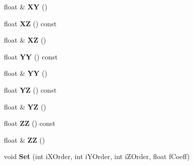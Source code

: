 \begin{DoxyCompactItemize}
\item 
float \& {\bfseries XY} ()\hypertarget{class_i_dream_sky_1_1_quadratic3_ace59a08e7f7f9939187899d1bd9c19e2}{}\label{class_i_dream_sky_1_1_quadratic3_ace59a08e7f7f9939187899d1bd9c19e2}

\item 
float {\bfseries XZ} () const \hypertarget{class_i_dream_sky_1_1_quadratic3_a90ebbdca6e12599e12ecb9d8e4b46a60}{}\label{class_i_dream_sky_1_1_quadratic3_a90ebbdca6e12599e12ecb9d8e4b46a60}

\item 
float \& {\bfseries XZ} ()\hypertarget{class_i_dream_sky_1_1_quadratic3_a054207ff4d3bb23920f407c149e623a5}{}\label{class_i_dream_sky_1_1_quadratic3_a054207ff4d3bb23920f407c149e623a5}

\item 
float {\bfseries YY} () const \hypertarget{class_i_dream_sky_1_1_quadratic3_a0362d59a4bec2b548476c17549f7b4b1}{}\label{class_i_dream_sky_1_1_quadratic3_a0362d59a4bec2b548476c17549f7b4b1}

\item 
float \& {\bfseries YY} ()\hypertarget{class_i_dream_sky_1_1_quadratic3_af0f3426bf9f33e0ef3225d27656fc51d}{}\label{class_i_dream_sky_1_1_quadratic3_af0f3426bf9f33e0ef3225d27656fc51d}

\item 
float {\bfseries YZ} () const \hypertarget{class_i_dream_sky_1_1_quadratic3_ae9930217b700a8c8dc71b1926d40a4ac}{}\label{class_i_dream_sky_1_1_quadratic3_ae9930217b700a8c8dc71b1926d40a4ac}

\item 
float \& {\bfseries YZ} ()\hypertarget{class_i_dream_sky_1_1_quadratic3_a21db3279a7c3ce68f0dc7a4123b201e1}{}\label{class_i_dream_sky_1_1_quadratic3_a21db3279a7c3ce68f0dc7a4123b201e1}

\item 
float {\bfseries ZZ} () const \hypertarget{class_i_dream_sky_1_1_quadratic3_a0b9735aca73f1743ec60dc9b806808e0}{}\label{class_i_dream_sky_1_1_quadratic3_a0b9735aca73f1743ec60dc9b806808e0}

\item 
float \& {\bfseries ZZ} ()\hypertarget{class_i_dream_sky_1_1_quadratic3_a0b187a4add7680657650bb6cb9368205}{}\label{class_i_dream_sky_1_1_quadratic3_a0b187a4add7680657650bb6cb9368205}

\item 
void {\bfseries Set} (int i\+X\+Order, int i\+Y\+Order, int i\+Z\+Order, float f\+Coeff)\hypertarget{class_i_dream_sky_1_1_quadratic3_a46c2f84c268acf1077abf3351bed2d0d}{}\label{class_i_dream_sky_1_1_quadratic3_a46c2f84c268acf1077abf3351bed2d0d}


\end{DoxyCompactItemize}
